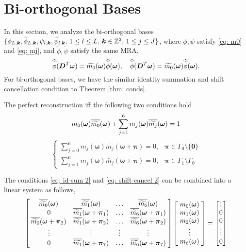 \section{Bi-orthogonal Bases}\label{sec: bi-orth}
In this section, we analyze the bi-orthogonal bases $\{\phi_{L,\boldsymbol{k}},\widetilde{\phi}_{L,\boldsymbol{k}}, \psi_{l,\boldsymbol{k}},\widetilde{\psi}_{l,\boldsymbol{k}},\, 1\leq l\leq L,\,\boldsymbol{k}\in\mathbb{Z}^2,\,1\leq j\leq J \}$, where $\phi,\psi$ satisfy \eqref{eq: m0} and \eqref{eq: mj}, and $\widetilde{\phi},\widetilde{\psi}$ satisfy the same MRA,
$$\widehat{\widetilde{\phi}}(\boldsymbol{D}^T\boldsymbol{\omega}) = \widetilde{m_0}(\boldsymbol{\omega})\widehat{\widetilde{\phi}}(\boldsymbol{\omega}),\quad \widehat{\widetilde{\phi}}(\boldsymbol{D}^T\boldsymbol{\omega}) = \widetilde{m_0}(\boldsymbol{\omega})\widehat{\widetilde{\phi}}(\boldsymbol{\omega}).$$
For bi-orthogonal bases, we have the similar identity summation and shift cancellation condition to Theorem \ref{thm: conds}.
\begin{thm}\label{thm: bi-orth conds}
The perfect reconstruction iff the following two conditions hold
\begin{align}\label{eq: id-sum 2}
m_0(\boldsymbol{\omega})\overline{\widetilde{m_{0}}}(\boldsymbol{\omega}) + \sum_{j = 1}^6 m_j(\boldsymbol{\omega})\overline{\widetilde{m_{j}}}(\boldsymbol{\omega}) = 1
\end{align}
\begin{equation}\label{eq: shift-cancel 2}
\begin{cases}
\sum_{j = 0}^6m_j(\boldsymbol{\omega})\overline{\widetilde{m_j}}(\boldsymbol{\omega} + \boldsymbol{\pi}) = 0, & \boldsymbol{\pi}\in \Gamma_0\setminus\{\boldsymbol{0}\}\\[.5em]
\sum_{j=1}^6m_j(\boldsymbol{\omega})\overline{\widetilde{m_j}}(\boldsymbol{\omega}+\boldsymbol{\pi}) = 0, & \boldsymbol{\pi}\in\Gamma_1\setminus\Gamma_0
\end{cases}
\end{equation}
\end{thm}
The conditions \eqref{eq: id-sum 2} and \eqref{eq: shift-cancel 2} can be combined into a linear system as follows,
\begin{align}\label{eq: LS-new}
\begin{bmatrix}
    \,\overline{\widetilde{m_{0}}}(\boldsymbol{\omega}) & \overline{\widetilde{m_{1}}}(\boldsymbol{\omega}) & \hdots & \overline{\widetilde{m_{6}}}(\boldsymbol{\omega})\;  \\
    \;0 & \overline{\widetilde{m_{1}}}(\boldsymbol{\omega} + \boldsymbol{\pi}_{1})  & \hdots  & \overline{\widetilde{m_{6}}}(\boldsymbol{\omega} + \boldsymbol{\pi}_{1})\; \\
    \,\overline{\widetilde{m_{0}}}(\boldsymbol{\omega} + \boldsymbol{\pi}_{2}) & \overline{\widetilde{m_{1}}}(\boldsymbol{\omega} + \boldsymbol{\pi}_{2}) & \hdots & \overline{\widetilde{m_{6}}}(\boldsymbol{\omega} + \boldsymbol{\pi}_{2})\;\\
    \;\vdots & \vdots & \vdots & \vdots \; \\
    \;0 & \overline{\widetilde{m_{1}}}(\boldsymbol{\omega} + \boldsymbol{\pi}_{7}) & \hdots & \overline{\widetilde{m_{6}}}(\boldsymbol{\omega} + \boldsymbol{\pi}_{7})\;
\end{bmatrix}
\begin{bmatrix}
\;m_{0}(\boldsymbol{\omega})\; \\
\;m_{1}(\boldsymbol{\omega})\; \\
\;m_{2}(\boldsymbol{\omega})\; \\
\; \vdots\; \\
\;m_{6}(\boldsymbol{\omega})\; 
\end{bmatrix} 
=
\begin{bmatrix}
1\\
0\\
0\\
\vdots \\
0
\end{bmatrix}
\end{align}
